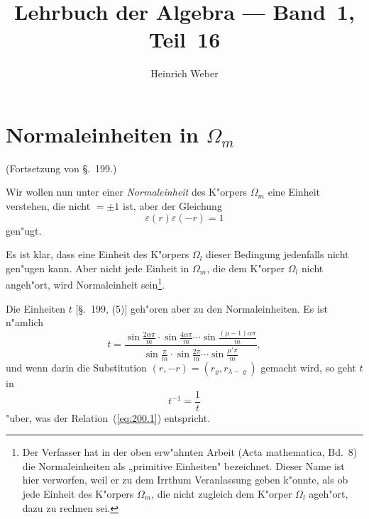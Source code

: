 \documentclass[10pt,a4paper]{article}
\title{Lehrbuch der Algebra --- Band~1, Teil~16}
\author{Heinrich Weber}
\date{}
\theoremstyle{weberstyle}
\begin{document}
\maketitle
\thispagestyle{empty}

\tableofcontents
\newpage

\setcounter{section}{199}

\section{Normaleinheiten in $\Omega_m$}\label{sec:200}

(Fortsetzung von \S.~199.)

Wir wollen nun unter einer \emph{Normaleinheit} des K"orpers
$\Omega_m$ eine Einheit verstehen, die nicht $=\pm 1$ ist, aber der
Gleichung
\begin{equation}\label{eq:200.1}
\varepsilon(r)\varepsilon(-r)=1
\end{equation}
gen"ugt.

Es ist klar, dass eine Einheit des K"orpers $\Omega_l$ dieser Bedingung
jedenfalls nicht gen"ugen kann. Aber nicht jede Einheit in $\Omega_m$, die
dem K"orper $\Omega_l$ nicht angeh"ort, wird Normaleinheit sein\footnote{Der
Verfasser hat in der oben erw"ahnten Arbeit (Acta mathematica, Bd.~8) die
Normaleinheiten als „primitive Einheiten" bezeichnet. Dieser Name ist hier
verworfen, weil er zu dem Irrthum Veranlassung geben k"onnte, als ob jede
Einheit des K"orpers $\Omega_m$, die nicht zugleich dem K"orper $\Omega_l$
ageh"ort, dazu zu rechnen sei.}.

Die Einheiten $t$ [\S.~199, (5)] geh"oren aber zu den Normaleinheiten.
Es ist n"amlich
\begin{equation}\label{eq:200.2}
t=\frac{\sin\frac{2\alpha\pi}{m}\cdot\sin\frac{4\alpha\pi}{m}
\cdots\sin\frac{(\mu-1)\alpha\pi}{m}}{\sin\frac{\pi}{m}\cdot\sin\frac{2\pi}{m}
\cdots\sin\frac{\mu'\pi}{m}},
\end{equation}
und wenn darin die Substitution $(r,-r)=(r_\varrho,r_{\lambda-\varrho})$
gemacht wird, so geht $t$ in
\begin{equation}\label{eq:200.3}
t^{-1}=\frac{1}{t}
\end{equation}
"uber, was der Relation~(\ref{eq:200.1}) entspricht.
\end{document}
